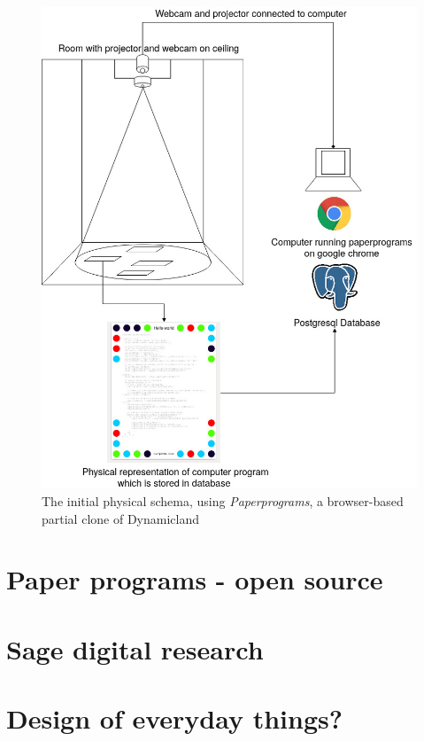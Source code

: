\documentclass[12pt]{report}
\begin{document}
\begin{figure}[htbp]
\centering
\includegraphics[width=15cm]{assets/pp-diag.png}
\caption{The initial physical schema, using \emph{Paperprograms}, a browser-based partial clone of Dynamicland \label{pp-schema}}
\end{figure}



\section{Paper programs - open source}
\label{sec:orgf6f2ecd}

\section{Sage digital research}
\label{sec:org8c8ca39}

\section{Design of everyday things?}
\label{sec:org7d9b5ba}
\end{document}
